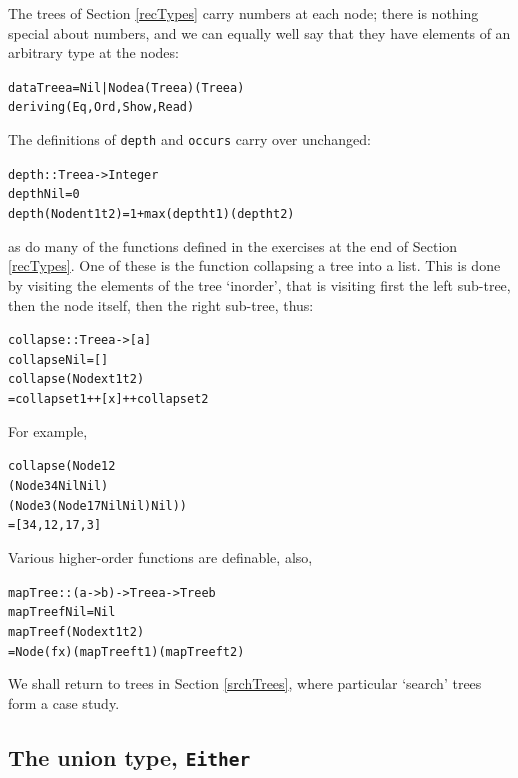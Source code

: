The trees of Section \ref{recTypes} carry numbers at each node; there is
nothing special about numbers, and we can equally well say that
they have elements of an arbitrary type at the nodes:
\begin{alltt}
data Tree a = Nil | Node a (Tree a) (Tree a)
              deriving (Eq,Ord,Show,Read)
\end{alltt}
The definitions of \texttt{depth} and \texttt{occurs} carry over unchanged:
\begin{alltt}
depth :: Tree a -> Integer
depth Nil            = 0
depth (Node n t1 t2) = 1 + max (depth t1) (depth t2)
\end{alltt}
as do many of the functions defined in the exercises at the end of Section
\ref{recTypes}.  
One of these is the function collapsing a tree into a list. This is done
by visiting the elements of the tree `inorder', that is visiting first the left
sub-tree, then the node itself, then the right sub-tree, thus:
\begin{alltt}
collapse :: Tree a -> [a]
collapse Nil = []
collapse (Node x t1 t2)
  = collapse t1 ++ [x] ++ collapse t2
\end{alltt}
For example,
\begin{alltt}
collapse (Node 12 
               (Node 34 Nil Nil) 
               (Node 3 (Node 17 Nil Nil) Nil))
  = [34,12,17,3]
\end{alltt}
Various higher-order functions are definable, also,
\begin{alltt}
mapTree :: (a -> b) -> Tree a -> Tree b
mapTree f Nil = Nil
mapTree f (Node x t1 t2)
  = Node (f x) (mapTree f t1) (mapTree f t2)
\end{alltt}
We shall return to trees in Section \ref{srchTrees}, where
particular `search' trees form a case study.


\subsection*{The union type, \texttt{Either}}


